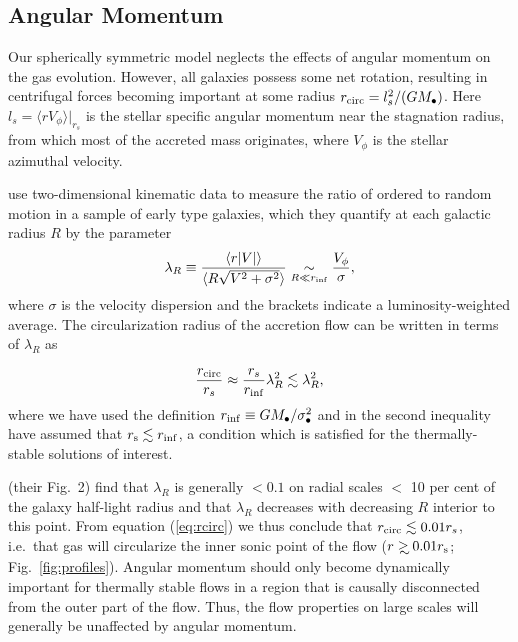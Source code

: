 \documentclass[usenatbib,fleqn]{mn2e}
\newcommand\gsim{\mathrel{\rlap{\lower4pt\hbox{\hskip1pt$\sim$}}
    \raise1pt\hbox{$>$}}}
\begin{document}
  \subsection{Angular Momentum}
  \label{sec:rotation}

  Our spherically symmetric model neglects the effects of angular
  momentum on the gas evolution.  However, all galaxies possess some
  net rotation, resulting in centrifugal forces becoming important at
  some radius $r_{\rm circ} = l^{2}_{s}/(GM_{\bullet})$.  Here
  $l_{s} = \langle r V_{\phi}\rangle |_{r_s}$ is the stellar
  specific angular momentum near the stagnation radius, from which
  most of the accreted mass originates, where $V_{\phi}$ is the
  stellar azimuthal velocity.

  \citet{EmsellemCappellari+:2007a} use two-dimensional kinematic data
  to measure the ratio of ordered to random motion in a sample of
  early type galaxies, which they quantify at each galactic radius $R$
  by the parameter
  \begin{align}
    \lambda_R \equiv \frac{\langle r|V|\rangle}{\langle R\sqrt{V^2+\sigma^2}\rangle} \underset{R \ll r_{\rm inf}}\sim \frac{V_{\phi}}{\sigma},
  \end{align}
  where $\sigma$ is the velocity dispersion and the brackets indicate
  a luminosity-weighted average.  The circularization radius of the
  accretion flow can be written in terms of $\lambda_R$ as

\begin{equation}
\frac{r_{\rm circ}}{r_{s}} \approx \frac{r_{s}}{r_{\rm inf}}\lambda_{R}^{2} \lesssim \lambda_{R}^{2},
\label{eq:rcirc}
\end{equation}
where we have used the definition $r_{\rm inf} \equiv
GM_{\bullet}/\sigma_{\bullet}^{2}$ and in the second inequality have assumed
that $r_{\rm s} \lesssim r_{\rm inf}$, a condition which is satisfied
for the thermally-stable solutions of interest.

\citet{EmsellemCappellari+:2007a} (their Fig.~2) find that $\lambda_R$
is generally $< 0.1$ on radial scales $<$ 10 per cent of the galaxy
half-light radius and that $\lambda_R$ decreases with decreasing $R$
interior to this point.  From equation (\ref{eq:rcirc}) we thus
conclude that $r_{\rm circ} \lesssim 0.01r_{s}$, i.e.~that gas will
circularize the inner sonic point of the flow ($r\gsim 0.01r_{\rm s}$;
Fig.~\ref{fig:profiles}).  Angular momentum should only become
dynamically important for thermally stable flows in a region that is
causally disconnected from the outer part of the flow. Thus, the flow
properties on large scales will generally be unaffected by angular momentum.
\end{document}
